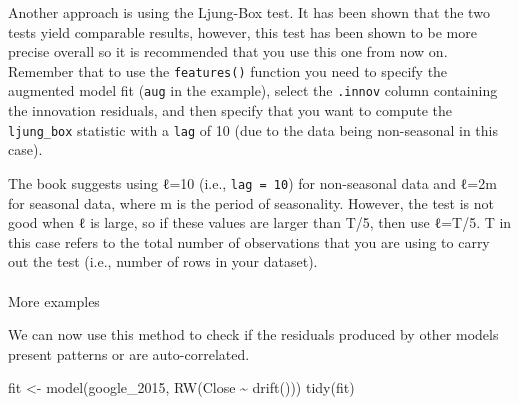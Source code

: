 \documentclass[
  letterpaper,
  DIV=11,
  numbers=noendperiod]{scrartcl}
\makeatletter
\let\oldparagraph\paragraph
\renewcommand{\paragraph}{
    \@ifstar
      \xxxParagraphStar
      \xxxParagraphNoStar
  }
\newcommand{\xxxParagraphStar}[1]{\oldparagraph*{#1}\mbox{}}
\newcommand{\xxxParagraphNoStar}[1]{\oldparagraph{#1}\mbox{}}
\newenvironment{Shaded}{\begin{snugshade}}{\end{snugshade}}
\newcommand{\FunctionTok}[1]{\textcolor[rgb]{0.28,0.35,0.67}{#1}}
\newcommand{\NormalTok}[1]{\textcolor[rgb]{0.00,0.23,0.31}{#1}}
\newcommand{\OtherTok}[1]{\textcolor[rgb]{0.00,0.23,0.31}{#1}}
\newcommand{\SpecialCharTok}[1]{\textcolor[rgb]{0.37,0.37,0.37}{#1}}
\newcommand*\circled[1]{\tikz[baseline=(char.base)]{
          \node[shape=circle,draw,inner sep=1pt] (char) {{\scriptsize#1}};}}
\makeatother
\begin{document}
Another approach is using the Ljung-Box test. It has been shown that the
two tests yield comparable results, however, this test has been shown to
be more precise overall so it is recommended that you use this one from
now on. Remember that to use the \texttt{features()} function you need
to specify the augmented model fit (\texttt{aug} in the example), select
the \texttt{.innov} column containing the innovation residuals, and then
specify that you want to compute the \texttt{ljung\_box} statistic with
a \texttt{lag} of 10 (due to the data being non-seasonal in this case).

\begin{tcolorbox}[enhanced jigsaw, toptitle=1mm, titlerule=0mm, leftrule=.75mm, opacityback=0, breakable, colback=white, bottomrule=.15mm, rightrule=.15mm, left=2mm, toprule=.15mm, bottomtitle=1mm, title=\textcolor{quarto-callout-important-color}{\faExclamation}\hspace{0.5em}{Important}, arc=.35mm, colbacktitle=quarto-callout-important-color!10!white, opacitybacktitle=0.6, coltitle=black, colframe=quarto-callout-important-color-frame]

The book suggests using ℓ=10 (i.e., \texttt{lag\ =\ 10}) for
non-seasonal data and ℓ=2m for seasonal data, where m is the period of
seasonality. However, the test is not good when ℓ is large, so if these
values are larger than T/5, then use ℓ=T/5. T in this case refers to the
total number of observations that you are using to carry out the test
(i.e., number of rows in your dataset).

\end{tcolorbox}

\paragraph{More examples}\label{more-examples-1}

We can now use this method to check if the residuals produced by other
models present patterns or are auto-correlated.

\label{annotated-cell-35}%
\begin{Shaded}
\begin{Highlighting}[]
\NormalTok{fit }\OtherTok{\textless{}{-}} \FunctionTok{model}\NormalTok{(google\_2015, }\FunctionTok{RW}\NormalTok{(Close }\SpecialCharTok{\textasciitilde{}} \FunctionTok{drift}\NormalTok{()))}
\FunctionTok{tidy}\NormalTok{(fit) }\hspace*{\fill}\NormalTok{\circled{1}}
\end{Highlighting}
\end{Shaded}
\end{document}
